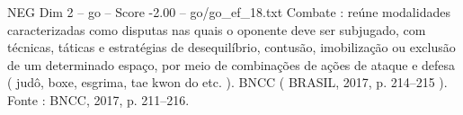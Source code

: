 \begin{textsample}{NEG Dim 2 – go – Score -2.00 – go/go\_ef\_18.txt}
Combate : reúne modalidades caracterizadas como disputas nas quais o oponente deve ser subjugado, com técnicas, táticas e estratégias de desequilíbrio, contusão, imobilização ou exclusão de um determinado espaço, por meio de combinações de ações de ataque e defesa ( judô, boxe, esgrima, tae kwon do etc. ).
BNCC ( BRASIL, 2017, p. 214–215 ).
Fonte : BNCC, 2017, p. 211–216.

\end{textsample}
